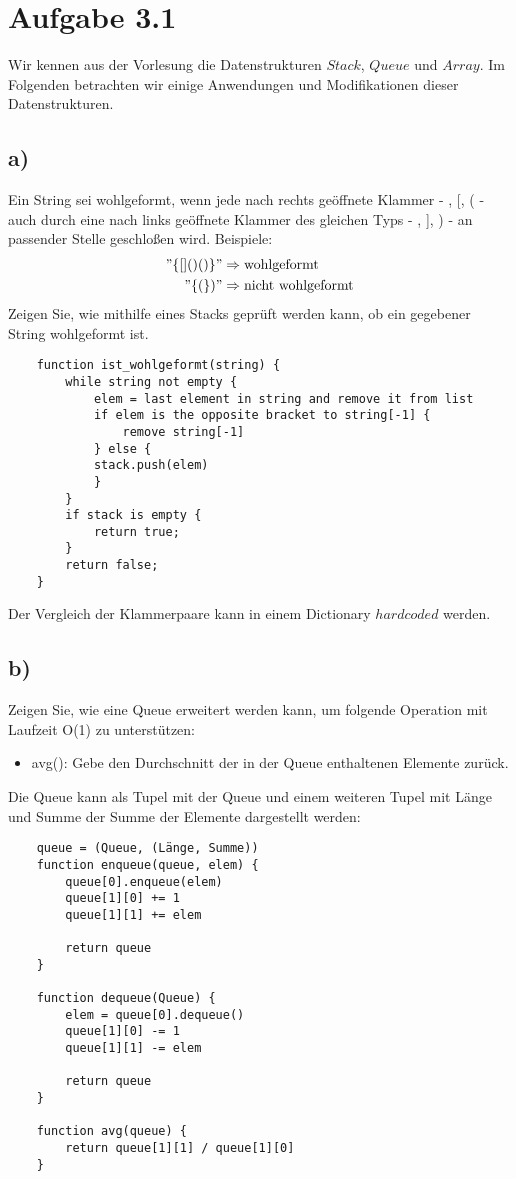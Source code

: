 \documentclass[a4paper]{article}
\begin{document}
\section*{Aufgabe 3.1}
Wir kennen aus der Vorlesung die Datenstrukturen $Stack$, $Queue$ und $Array$. Im Folgenden betrachten
wir einige Anwendungen und Modifikationen dieser Datenstrukturen.
\subsection*{a)}
Ein String sei wohlgeformt, wenn jede nach rechts geöffnete Klammer - {, [, ( - auch durch eine
nach links geöffnete Klammer des gleichen Typs - }, ], ) - an passender Stelle geschloßen wird.
Beispiele:
\begin{align*}
"\{[]()()\}" &\Rightarrow \text{wohlgeformt}\\
"\{(\})" &\Rightarrow \text{nicht wohlgeformt}
\end{align*}
Zeigen Sie, wie mithilfe eines Stacks geprüft werden kann, ob ein gegebener String wohlgeformt
ist.

\begin{verbatim}
    function ist_wohlgeformt(string) {
        while string not empty {
            elem = last element in string and remove it from list
            if elem is the opposite bracket to string[-1] {
                remove string[-1]
            } else {
            stack.push(elem)
            }
        }
        if stack is empty {
            return true;
        }
        return false;
    }
\end{verbatim}
Der Vergleich der Klammerpaare kann in einem Dictionary $hardcoded$ werden.


\subsection*{b)}
Zeigen Sie, wie eine Queue erweitert werden kann, um folgende Operation mit Laufzeit O(1)
zu unterstützen:

\begin{itemize}
    \item avg(): Gebe den Durchschnitt der in der Queue enthaltenen Elemente zurück.
\end{itemize}

Die Queue kann als Tupel mit der Queue und einem weiteren Tupel mit Länge und Summe der Summe der Elemente dargestellt werden:

\begin{verbatim}
    queue = (Queue, (Länge, Summe))
    function enqueue(queue, elem) {
        queue[0].enqueue(elem)
        queue[1][0] += 1
        queue[1][1] += elem

        return queue
    }

    function dequeue(Queue) {
        elem = queue[0].dequeue()
        queue[1][0] -= 1
        queue[1][1] -= elem

        return queue
    }
    
    function avg(queue) {
        return queue[1][1] / queue[1][0]
    }
\end{verbatim}
\end{document}
